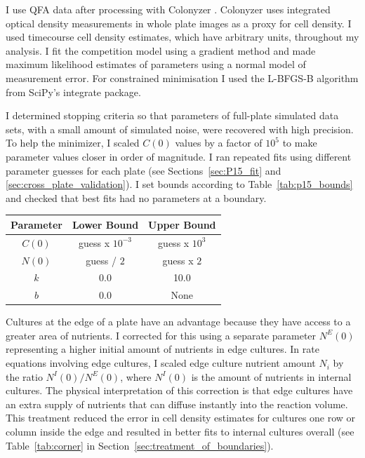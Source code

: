 I use QFA data after processing with Colonyzer \citep{Lawless2010}.
Colonyzer uses integrated optical density measurements in whole plate
images as a proxy for cell density. I used timecourse cell density
estimates, which have arbitrary units, throughout my analysis. I fit
the competition model using a gradient method and made maximum
likelihood estimates of parameters using a normal model of measurement
error. For constrained minimisation I used the L-BFGS-B algorithm from
SciPy's integrate package.

I determined stopping criteria so that parameters of full-plate
simulated data sets, with a small amount of simulated noise, were
recovered with high precision. To help the minimizer, I scaled
\(C(0)\) values by a factor of \(10^{5}\) to make parameter values
closer in order of magnitude. I ran repeated fits using different
parameter guesses for each plate (see Sections~\ref{sec:P15_fit} and
\ref{sec:cross_plate_validation}). I set bounds according to
Table~\ref{tab:p15_bounds} and checked that best fits had no
parameters at a boundary.
%
\begin{center}
  \begin{tabular}{| c | c c |}
    \hline
    Parameter        & Lower Bound  & Upper Bound \\
    \hline
    \(C(0)\)     & guess x \(10^{-3}\)  & guess x \(10^{3}\)\\
    \(N(0)\)     & guess / \(2\)  & guess x \(2\)\\
    \(k\)        & 0.0    & 10.0\\
    \(b\)           & 0.0    & None \\
    \hline
  \end{tabular}
  \label{tab:p15_bounds}
\end{center}
%
Cultures at the edge of a plate have an advantage because they have
access to a greater area of nutrients. I corrected for this using a
separate parameter \(N^{E}(0)\) representing a higher initial amount
of nutrients in edge cultures. In rate equations involving edge
cultures, I scaled edge culture nutrient amount \(N_{i}\) by the ratio
\(N^{I}(0)/N^{E}(0)\), where \(N^{I}(0)\) is the amount of nutrients
in internal cultures. The physical interpretation of this correction
is that edge cultures have an extra supply of nutrients that can
diffuse instantly into the reaction volume. This treatment reduced the
error in cell density estimates for cultures one row or column inside
the edge and resulted in better fits to internal cultures overall (see
Table~\ref{tab:corner} in
Section~\ref{sec:treatment_of_boundaries}).

